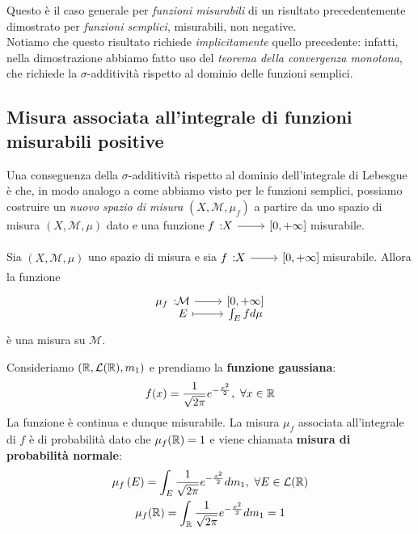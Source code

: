 \begin{observe}
	Questo è il caso generale per \textit{funzioni misurabili} di un risultato precedentemente dimostrato per \textit{funzioni semplici}, misurabili, non negative.\\
	Notiamo che questo risultato richiede \textit{implicitamente} quello precedente: infatti, nella dimostrazione abbiamo fatto uso del \textit{teorema della convergenza monotona}, che richiede la $\sigma$-additività rispetto al dominio delle funzioni semplici.
\end{observe}
\subsection{Misura associata all'integrale di funzioni misurabili positive}\label{misuraindotta}
Una conseguenza della $\sigma$-additività rispetto al dominio dell'integrale di Lebesgue è che, in modo analogo a come abbiamo visto per le funzioni semplici, possiamo costruire un \textit{nuovo spazio di misura} $\left(X,\mathcal{M},\mu_f\right)$ a partire da uno spazio di misura $\left(X,\mathcal{M},\mu\right)$ dato e una funzione $\funz{f}{X}{\left[0,+\infty\right]}$ misurabile.
\begin{corollaryqed}
Sia $\left(X,\mathcal{M},\mu\right)$ uno spazio di misura e sia $\funz{f}{X}{\left[0,+\infty\right]}$ misurabile. Allora la funzione
\begin{equation}
	\funztot{\mu_f}{\mathcal{M}}{\left[0,+\infty\right]}{E}{\int_Efd\mu}
\end{equation}
è una misura su $\mathcal{M}$.
\end{corollaryqed}
\begin{example}\label{gaussiana}
	Consideriamo $\left(\mathbb{R},\mathcal{L}(\mathbb{R}),m_1\right)$ e prendiamo la \textbf{funzione gaussiana}:
	\begin{equation*}
		f(x)=\frac{1}{\sqrt{2\pi}}e^{-\frac{x^2}{2}},\ \forall x\in\realset
	\end{equation*}
	La funzione è continua e dunque misurabile. La misura $\mu_f$ associata all'integrale di $f$ è di probabilità dato che $\mu_f(\mathbb{R})=1$ e viene chiamata \textbf{misura di probabilità normale}:
	\begin{gather*}
		\mu_f\left(E\right)=\int_E\frac{1}{\sqrt{2\pi}}e^{-\frac{x^2}{2}}dm_1,\ \forall E\in\mathcal{L}(\realset)\\
		\mu_f(\realset)=\int_{\realset}\frac{1}{\sqrt{2\pi}}e^{-\frac{x^2}{2}}dm_1=1
	\end{gather*}
\end{example}
